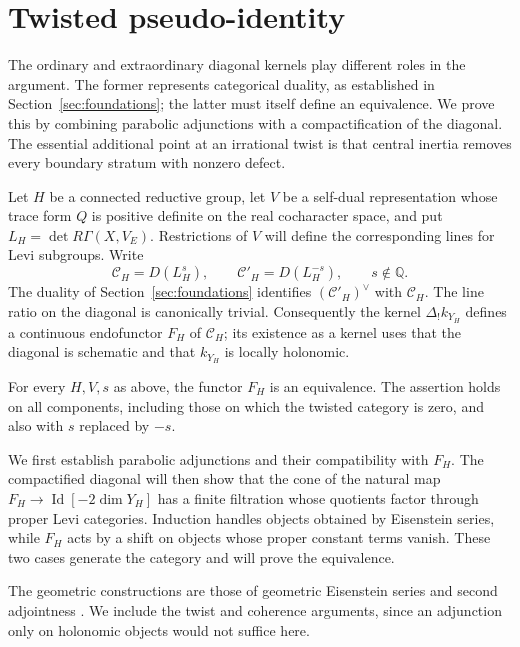 \section{Twisted pseudo-identity}\label{sec:pseudoidentity}

The ordinary and extraordinary diagonal kernels play different roles in the
argument.  The former represents categorical duality, as established in
Section~\ref{sec:foundations}; the latter must itself define an equivalence.
We prove this by combining parabolic adjunctions with a compactification of
the diagonal.  The essential additional point at an irrational twist is that
central inertia removes every boundary stratum with nonzero defect.

Let $H$ be a connected reductive group, let $V$ be a self-dual representation
whose trace form $Q$ is positive definite on the real cocharacter space, and
put $L_H=\det R\Gamma(X,V_E)$.  Restrictions of $V$ will define the corresponding
lines for Levi subgroups.  Write
\[
 \mathcal C_H=D(L_H^s),\qquad \mathcal C'_H=D(L_H^{-s}),\qquad s\notin\mathbb Q.
\]
The duality of Section~\ref{sec:foundations} identifies
$(\mathcal C'_H)^\vee$ with $\mathcal C_H$.  The line ratio on the diagonal is
canonically trivial.  Consequently the kernel $\Delta_!k_{Y_H}$ defines a
continuous endofunctor $F_H$ of $\mathcal C_H$; its existence as a kernel uses
that the diagonal is schematic and that $k_{Y_H}$ is locally holonomic.

\begin{theorem}\label{pseudo:equivalence}
For every $H,V,s$ as above, the functor $F_H$ is an equivalence.  The assertion
holds on all components, including those on which the twisted category is
zero, and also with $s$ replaced by $-s$.
\end{theorem}

We first establish parabolic adjunctions and their compatibility with
$F_H$.  The compactified diagonal will then show that the cone of the
natural map $F_H\to\operatorname{Id}[-2\dim Y_H]$ has a finite
filtration whose quotients factor through proper Levi categories.  Induction handles objects obtained by
Eisenstein series, while $F_H$ acts by a shift on objects whose proper
constant terms vanish.  These two cases generate the category and will
prove the equivalence.

The geometric constructions are those of geometric Eisenstein series and second
adjointness \cite{BravermanGaitsgory,DrinfeldGaitsgoryCT}.  We include the twist
and coherence arguments, since an adjunction only on holonomic objects would
not suffice here.

